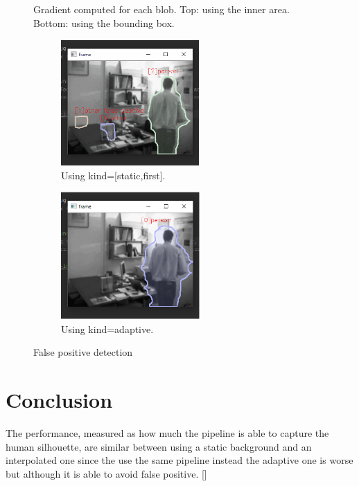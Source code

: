 \documentclass{article}
\newcommand{\CREF}[1]{[\hyperref[#1]{\Cref{#1}}]}
\begin{document}
\begin{figure}
    \caption{Gradient computed for each blob. Top: using the inner area. Bottom: using the bounding box.}
    \label{grad}
\end{figure}

\begin{figure}[ht]
    \centering
    \begin{subfigure}{0.47\textwidth}
        \centering
        \includegraphics[width=150pt,keepaspectratio]{background_static_falsepositive.PNG}
        \caption{Using kind=[static,first].}
        \label{Figure:fpl}
    \end{subfigure}
    \begin{subfigure}{0.47\textwidth}
        \centering
        \includegraphics[width=150pt,keepaspectratio]{background_adaptive_falsepositive.PNG}
        \caption{Using kind=adaptive.}
        \label{Figure:fpi}
    \end{subfigure}
    \caption{False positive detection}
\end{figure}

\section{Conclusion}
The performance, measured as how much the pipeline is able to capture the human silhouette, are similar between using a static background and an interpolated one since the use the same pipeline instead the adaptive one is worse but although it is able to avoid false positive. \CREF{out481}
\end{document}
